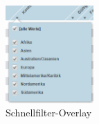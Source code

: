 \begin{figure}[H]
 \centering
 \includegraphics[width=0.3\textwidth]{grafiken/overlay.png}
 \caption{Schnellfilter-Overlay}
 \label{fig:autofilter}
\end{figure}
